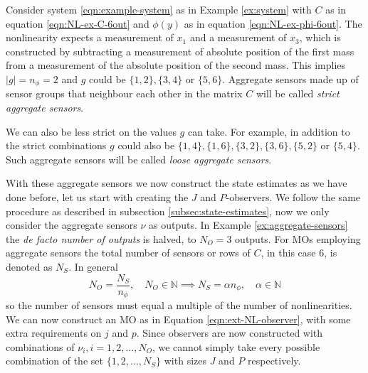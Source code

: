 \begin{example}\label{ex:aggregate-sensors}
    Consider system \eqref{eqn:example-system} as in Example \ref{ex:system} with $C$ as in equation \ref{eqn:NL-ex-C-6out} and $\phi(y)$ as in equation \eqref{eqn:NL-ex-phi-6out}. The nonlinearity expects a measurement of $x_1$ and a measurement of $x_3$, which is constructed by subtracting a measurement of absolute position of the first mass from a measurement of the absolute position of the second mass. This implies $|g|=n_{\phi}=2$ and $g$ could be $\{1,2\},\{3,4\}$ or $\{5,6\}$. Aggregate sensors made up of sensor groups that neighbour each other in the matrix $C$ will be called \textit{strict aggregate sensors}.

    We can also be less strict on the values $g$ can take. For example, in addition to the strict combinations $g$ could also be $\{1,4\},\{1,6\},\{3,2\},\{3,6\},\{5,2\}$ or $\{5,4\}$. Such aggregate sensors will be called \textit{loose aggregate sensors}.
\end{example}

With these aggregate sensors we now construct the state estimates as we have done before, let us start with creating the $J$ and $P$-observers. We follow the same procedure as described in subsection \ref{subsec:state-estimates}, now we only consider the aggregate sensors $\nu$ as outputs. In Example \ref{ex:aggregate-sensors} the \textit{de facto number of outputs} is halved, to $N_O=3$ outputs. For MOs employing aggregate sensors the total number of sensors or rows of $C$, in this case $6$, is denoted as $N_S$. In general
\begin{equation*}
    N_O = \frac{N_S}{n_{\phi}}, \quad N_O \in \mathbb{N} \implies N_S = \alpha n_{\phi}, \quad \alpha \in \mathbb{N}
\end{equation*}
so the number of sensors must equal a multiple of the number of nonlinearities. We can now construct an MO as in Equation \ref{eqn:ext-NL-observer}, with some extra requirements on $j$ and $p$. Since observers are now constructed with combinations of $\nu_i,i=1,2,\dots,N_O$, we cannot simply take every possible combination of the set $\{1,2,\dots,N_S\}$ with sizes $J$ and $P$ respectively. 

